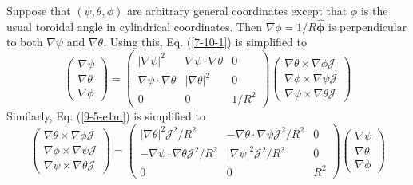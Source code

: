 \documentclass{llncs}
\newcommand{\tmmathbf}[1]{\ensuremath{\boldsymbol{#1}}}
\begin{document}
Suppose that $(\psi, \theta, \phi)$ are arbitrary general coordinates except
that $\phi$ is the usual toroidal angle in cylindrical coordinates. Then
$\nabla \phi = 1 / R \hat{\tmmathbf{\phi}}$ is perpendicular to both $\nabla
\psi$ and $\nabla \theta$. Using this, Eq. (\ref{7-10-1}) is simplified to
\begin{equation}
  \label{4-13-p3} \left(\begin{array}{c}
    \nabla \psi\\
    \nabla \theta\\
    \nabla \phi
  \end{array}\right) = \left(\begin{array}{ccc}
    | \nabla \psi |^2 & \nabla \psi \cdot \nabla \theta & 0\\
    \nabla \psi \cdot \nabla \theta & | \nabla \theta |^2 & 0\\
    0 & 0 & 1 / R^2
  \end{array}\right) \left(\begin{array}{c}
    \nabla \theta \times \nabla \phi \mathcal{J}\\
    \nabla \phi \times \nabla \psi \mathcal{J}\\
    \nabla \psi \times \nabla \theta \mathcal{J}
  \end{array}\right)
\end{equation}
Similarly, Eq. (\ref{9-5-e1m}) is simplified to
\begin{equation}
  \label{4-13-p4} \left(\begin{array}{c}
    \nabla \theta \times \nabla \phi \mathcal{J}\\
    \nabla \phi \times \nabla \psi \mathcal{J}\\
    \nabla \psi \times \nabla \theta \mathcal{J}
  \end{array}\right) = \left(\begin{array}{ccc}
    | \nabla \theta |^2 \mathcal{J}^2 / R^2 & - \nabla \theta \cdot \nabla
    \psi \mathcal{J}^2 / R^2 & 0\\
    - \nabla \psi \cdot \nabla \theta \mathcal{J}^2 / R^2 & | \nabla \psi |^2
    \mathcal{J}^2 / R^2 & 0\\
    0 & 0 & R^2
  \end{array}\right) \left(\begin{array}{c}
    \nabla \psi\\
    \nabla \theta\\
    \nabla \phi
  \end{array}\right)
\end{equation}
\end{document}
